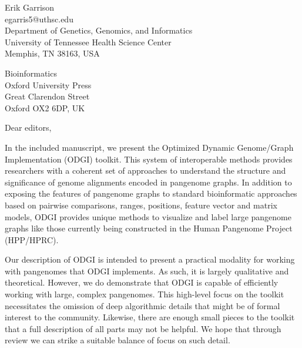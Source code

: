 \documentclass[12pt,hidelinks,letterpaper]{article}
\begin{document}
\begin{flushright}
  Erik Garrison \\
  egarris5@uthsc.edu \\
  Department of Genetics, Genomics, and Informatics \\
  University of Tennessee Health Science Center \\
  Memphis, TN 38163, USA
\end{flushright}


\begin{flushleft}
  Bioinformatics \\
  Oxford University Press \\
  Great Clarendon Street \\
  Oxford OX2 6DP, UK
\end{flushleft}


Dear editors,
\hfill \break

In the included manuscript, we present the Optimized Dynamic Genome/Graph Implementation (ODGI) toolkit.
This system of interoperable methods provides researchers with a coherent set of approaches to understand the structure and significance of genome alignments encoded in pangenome graphs.
In addition to exposing the features of pangenome graphs to standard bioinformatic approaches based on pairwise comparisons, ranges, positions, feature vector and matrix models, ODGI provides unique methods to visualize and label large pangenome graphs like those currently being constructed in the Human Pangenome Project (HPP/HPRC).

Our description of ODGI is intended to present a practical modality for working with pangenomes that ODGI implements.
As such, it is largely qualitative and theoretical.
However, we do demonstrate that ODGI is capable of efficiently working with large, complex pangenomes.
This high-level focus on the toolkit necessitates the omission of deep algorithmic details that might be of formal interest to the community.
Likewise, there are enough small pieces to the toolkit that a full description of all parts may not be helpful.
We hope that through review we can strike a suitable balance of focus on such detail.
\end{document}
